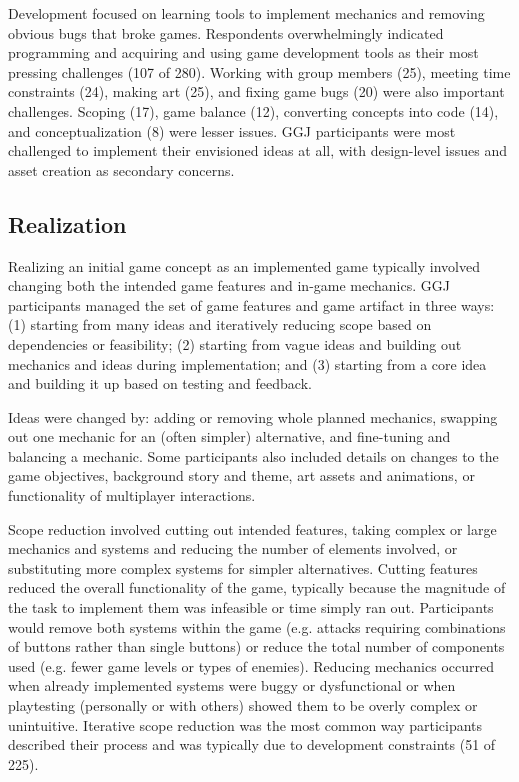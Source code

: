 \documentclass{sig-alternate}
\begin{document}
Development focused on learning tools to implement mechanics and removing obvious bugs that broke games. Respondents overwhelmingly indicated programming and acquiring and using game development tools as their most pressing challenges (107 of 280). Working with group members (25), meeting time constraints (24), making art (25), and fixing game bugs (20) were also important challenges. Scoping (17), game balance (12), converting concepts into code (14), and conceptualization (8) were lesser issues.
GGJ participants were most challenged to implement their envisioned ideas at all, with design-level issues and asset creation as secondary concerns.

\subsection{Realization}
Realizing an initial game concept as an implemented game typically involved changing both the intended game features and in-game mechanics. 
GGJ participants managed the set of game features and game artifact in three ways:
(1) starting from many ideas and iteratively reducing scope based on dependencies or feasibility;
(2) starting from vague ideas and building out mechanics and ideas during implementation;
and
(3) starting from a core idea and building it up based on testing and feedback.

Ideas were changed by: adding or removing whole planned mechanics, swapping out one mechanic for an (often simpler) alternative, and fine-tuning and balancing a mechanic. Some participants also included details on changes to the game objectives, background story and theme, art assets and animations, or functionality of multiplayer interactions.

Scope reduction involved cutting out intended features, taking complex or large mechanics and systems and reducing the number of elements involved, or substituting more complex systems for simpler alternatives.
Cutting features reduced the overall functionality of the game, typically because the magnitude of the task to implement them was infeasible or time simply ran out. Participants would remove both systems within the game (e.g. attacks requiring combinations of buttons rather than single buttons) or reduce the total number of components used (e.g. fewer game levels or types of enemies).
Reducing mechanics occurred when already implemented systems were buggy or dysfunctional or when playtesting (personally or with others) showed them to be overly complex or unintuitive. 
Iterative scope reduction was the most common way participants described their process and was typically due to development constraints (51 of 225).
\end{document}
